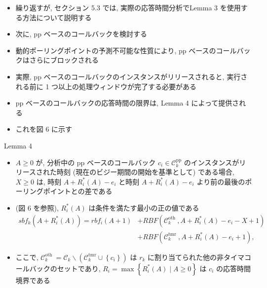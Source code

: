 \begin{frame}{}
    \begin{itemize}
        \item 繰り返すが, セクション 5.3 では, 実際の応答時間分析でLemma 3 を使用する方法について説明する
        \item 次に, pp ベースのコールバックを検討する
        \item 動的ポーリングポイントの予測不可能な性質により, pp ベースのコールバックはさらにブロックされる
        \item 実際, pp ベースのコールバックのインスタンスがリリースされると, 実行される前に 1 つ以上の処理ウィンドウが完了する必要がある
        \item pp ベースのコールバックの応答時間の限界は, Lemma 4 によって提供される
        \item これを図 6 に示す
    \end{itemize}
\end{frame}

\begin{frame}[label=lemma4]{Lemma 4}
    \begin{lemma}[]
        \begin{itemize}
            \item $A \geq 0$ が, 分析中の pp ベースのコールバック $c_{i} \in \mathcal{C}_{k}^{\mathrm{pp}}$ のインスタンスがリリースされた時刻 (現在のビジー期間の開始を基準として) である場合, $X \geq 0$ は, 時刻 $A+R_{i}^{*}(A)-e_{i}$ と時刻 $A+R_{i}^{*}(A)-e_{i}$ より前の最後のポーリングポイントとの差である
            \item (図 6 を参照), $R_{i}^{*}(A)$ は条件を満たす最小の正の値である
                  \begin{equation*}
                      \begin{aligned}
                          s b f_{k}\left(A+R_{i}^{*}(A)\right)=r b f_{i}(A+1) & +R B F\left(\mathcal{C}_{k}^{\text {oth }}, A+R_{i}^{*}(A)-e_{i}-X+1\right) \\
                                                                              & +R B F\left(\mathcal{C}_{k}^{\text {tmr }}, A+R_{i}^{*}(A)-e_{i}+1\right),
                      \end{aligned}
                  \end{equation*}
            \item ここで, $\mathcal{C}_{k}^{\text {oth }}=\mathcal{C}_{k} \backslash\left(\mathcal{C}_{k}^{\mathrm{tmr}} \cup\left\{c_{i}\right\}\right)$ は $r_{k}$ に割り当てられた他の非タイマコールバックのセットであり, $R_{i}=\max \left\{R_{i}^{*}(A) \mid A \geq 0\right\}$ は $c_{i}$ の応答時間境界である
        \end{itemize}
    \end{lemma}
\end{frame}

